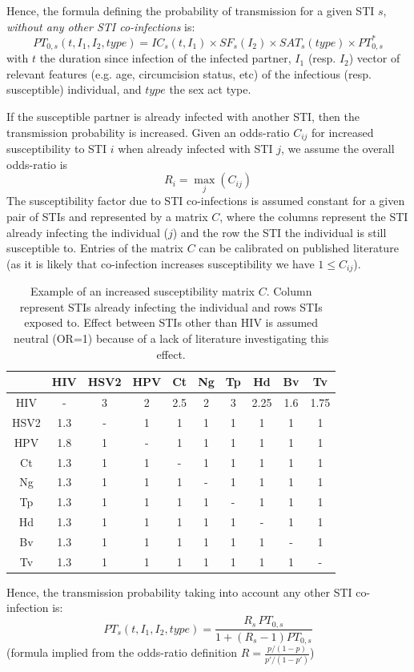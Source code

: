 \documentclass[11pt, onecolumn]{article}
\begin{document}
Hence, the formula defining the probability of transmission for a given STI $s$, \emph{without any other STI co-infections} is:
$$PT_{0,s}(t,I_1,I_2,type) =  IC_s(t,I_1)\times SF_s(I_2) \times SAT_s(type) \times PT_{0,s}^* $$
with $t$ the duration since infection of the infected partner, $I_1$ (resp. $I_2$) vector of relevant features (e.g. age, circumcision status, etc) of the infectious (resp. susceptible) individual, and $type$ the sex act type.

If the susceptible partner is already infected with another STI, then the transmission probability is increased. Given an odds-ratio $C_{ij}$ for increased susceptibility to STI $i$ when already infected with STI $j$, we assume the overall odds-ratio is
$$R_i = \max_j(C_{ij})$$
The susceptibility factor due to STI co-infections is assumed constant for a given pair of STIs and represented by a matrix $C$, where the columns represent the STI already infecting the individual ($j$) and the row the STI the individual is still susceptible to. 
Entries of the matrix $C$ can be calibrated on published literature (as it is likely that co-infection increases susceptibility we have $1\leq C_{ij}$). 

\begin{table}[htdp]
\begin{center}
\begin{tabular}{|c|c|c|c|c|c|c|c|c|c|}
\hline
&HIV&HSV2&HPV&Ct&Ng&Tp&Hd&Bv&Tv\\
\hline
HIV&-&3&2&2.5&2&3&2.25&1.6&1.75\\
HSV2&1.3&-&1&1&1&1&1&1&1\\
HPV&1.8&1&-&1&1&1&1&1&1\\
Ct&1.3&1&1&-&1&1&1&1&1\\
Ng&1.3&1&1&1&-&1&1&1&1\\
Tp&1.3&1&1&1&1&-&1&1&1\\
Hd&1.3&1&1&1&1&1&-&1&1\\
Bv&1.3&1&1&1&1&1&1&-&1\\
Tv&1.3&1&1&1&1&1&1&1&-\\
\hline
\end{tabular}
\end{center}
\caption{Example of an increased susceptibility matrix $C$. Column represent STIs already infecting the individual and rows STIs exposed to. Effect between STIs other than HIV is assumed neutral (OR=1) because of a lack of literature investigating this effect.}
\label{default}
\end{table}%

Hence, the transmission probability taking into account any other STI co-infection is:
$$PT_s(t,I_1,I_2,type) =\frac{R_s\,  PT_{0,s} }{1+ (R_s-1)PT_{0,s} }$$
(formula implied from the odds-ratio definition $R=\frac{p/(1-p)}{p'/(1-p')}$)
\end{document}
